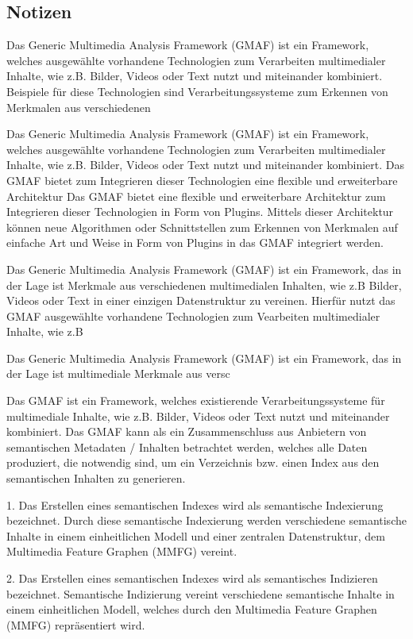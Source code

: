 \subsection{Notizen}

Das Generic Multimedia Analysis Framework (GMAF) ist ein Framework, welches ausgewählte vorhandene Technologien zum Verarbeiten multimedialer Inhalte, wie z.B. Bilder, Videos oder Text nutzt und miteinander kombiniert.
Beispiele für diese Technologien sind Verarbeitungssysteme zum Erkennen von Merkmalen aus verschiedenen 

Das Generic Multimedia Analysis Framework (GMAF) ist ein Framework, welches ausgewählte vorhandene Technologien zum Verarbeiten multimedialer Inhalte, wie z.B. Bilder, Videos oder Text nutzt und miteinander kombiniert.
Das GMAF bietet zum Integrieren dieser Technologien eine flexible und erweiterbare Architektur 
Das GMAF bietet eine flexible und erweiterbare Architektur zum Integrieren dieser Technologien in Form von Plugins.
Mittels dieser Architektur können neue Algorithmen oder Schnittstellen zum Erkennen von Merkmalen auf einfache Art und Weise in Form von Plugins in das GMAF integriert werden.


Das Generic Multimedia Analysis Framework (GMAF) ist ein Framework, das in der Lage ist Merkmale aus verschiedenen multimedialen Inhalten, wie z.B Bilder, Videos oder Text in einer einzigen Datenstruktur zu vereinen.
Hierfür nutzt das GMAF ausgewählte vorhandene Technologien zum Vearbeiten multimedialer Inhalte, wie z.B 

Das Generic Multimedia Analysis Framework (GMAF) ist ein Framework, das in der Lage ist multimediale Merkmale aus versc



Das GMAF ist ein Framework, welches existierende Verarbeitungssysteme für multimediale Inhalte, wie z.B. Bilder, Videos oder Text nutzt und miteinander kombiniert. 
Das GMAF kann als ein Zusammenschluss aus Anbietern von semantischen Metadaten / Inhalten betrachtet werden, welches alle Daten produziert, die notwendig sind, um ein Verzeichnis bzw. einen Index aus den semantischen Inhalten zu generieren.

1. Das Erstellen eines semantischen Indexes wird als semantische Indexierung bezeichnet.
Durch diese semantische Indexierung werden verschiedene semantische Inhalte in einem einheitlichen Modell und einer zentralen Datenstruktur, dem Multimedia Feature Graphen (MMFG) vereint.

2. Das Erstellen eines semantischen Indexes wird als semantisches Indizieren bezeichnet.
Semantische Indizierung vereint verschiedene semantische Inhalte in einem einheitlichen Modell, welches durch den Multimedia Feature Graphen (MMFG) repräsentiert wird.

